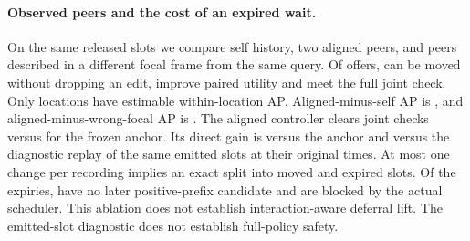 \paragraph{Observed peers and the cost of an expired wait.}
On the same released slots we compare self history, two aligned peers,
and peers described in a different focal frame from the same query.
Of \PeerOffers{} offers, \PeerPos{} can be moved without dropping an edit,
improve paired utility and meet the full joint check. Only
\PeerLocations{} locations have estimable within-location AP.
Aligned-minus-self AP is \PeerSelfAP{}, and aligned-minus-wrong-focal
AP is \PeerWrongAP{}. The aligned controller clears \PeerJoint{} joint
checks versus \PeerAnchor{} for the frozen anchor. Its direct gain is
\PeerFull{} versus the anchor and \PeerMatch{} versus the diagnostic
replay of the same emitted slots at their original times. At most one
change per recording implies an exact split into moved and expired
slots. Of the \PeerExpired{} expiries, \PeerProxy{} have no later
positive-prefix candidate and \PeerBlocked{} are blocked by the actual
scheduler. This ablation does not establish interaction-aware deferral
lift. The emitted-slot diagnostic does not establish full-policy safety.
